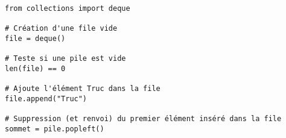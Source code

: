 \begin{lstlisting} 
from collections import deque

# Création d'une file vide
file = deque() 

# Teste si une pile est vide
len(file) == 0

# Ajoute l'élément Truc dans la file 
file.append("Truc")

# Suppression (et renvoi) du premier élément inséré dans la file
sommet = pile.popleft()

\end{lstlisting}

